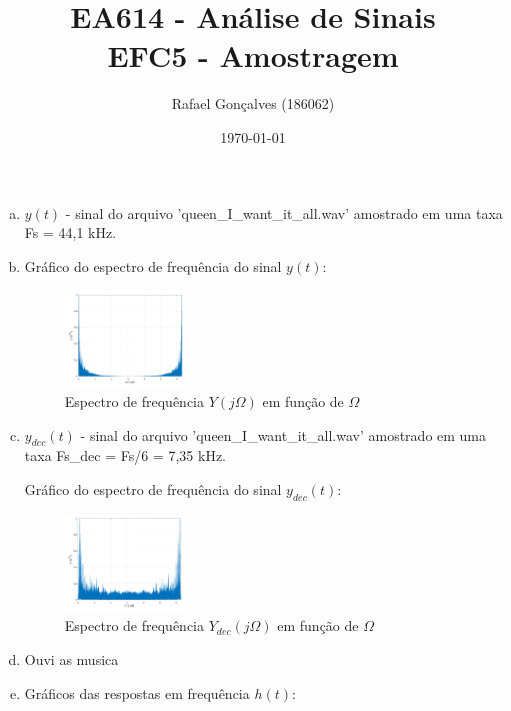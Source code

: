 \documentclass{article}
\begin{document}
\title{EA614 - Análise de Sinais \\
\large{EFC5 - Amostragem}}
\author{Rafael Gonçalves (186062)}
\date{\today}

\maketitle

\begin{enumerate}[(a)]
\item
    $y(t)$ - sinal do arquivo 'queen\_I\_want\_it\_all.wav' amostrado em uma taxa Fs = 44,1 kHz.

\item
    Gráfico do espectro de frequência do sinal $y(t)$:
    \begin{figure}[H]
    \centering
    \includegraphics[width=0.3\textwidth]{images/spectre.png}
        \caption{Espectro de frequência $Y(j\Omega)$ em função de $\Omega$}
    \end{figure}

\item
    $y_{dec}(t)$ - sinal do arquivo 'queen\_I\_want\_it\_all.wav' amostrado em uma taxa Fs\_dec = Fs/6 = 7,35 kHz.

    Gráfico do espectro de frequência do sinal $y_{dec}(t)$:
    \begin{figure}[H]
    \centering
    \includegraphics[width=0.3\textwidth]{images/spectre_dec.png}
        \caption{Espectro de frequência $Y_{dec}(j\Omega)$ em função de $\Omega$}
    \end{figure}
\break\vfill

\item
    Ouvi as musica

\item
    Gráficos das respostas em frequência $h(t)$:


\end{enumerate}
\end{document}
